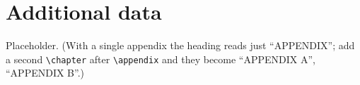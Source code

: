 \chapter{Additional data}\label{app:data}

Placeholder. (With a single appendix the heading reads just ``APPENDIX'';
add a second \verb|\chapter| after \verb|\appendix| and they become
``APPENDIX A'', ``APPENDIX B''.)

